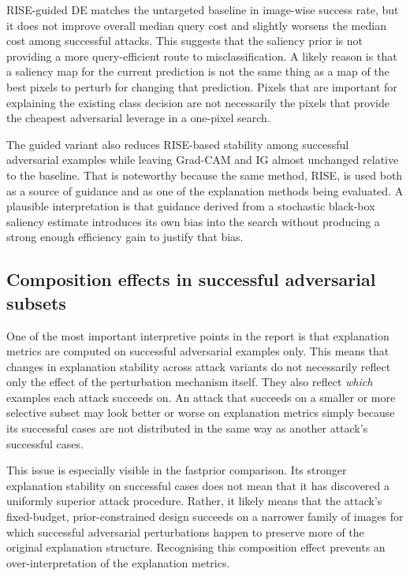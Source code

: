RISE-guided DE matches the untargeted baseline in image-wise success rate, but it does not improve overall median query cost and slightly worsens the median cost among successful attacks.
This suggests that the saliency prior is not providing a more query-efficient route to misclassification.
A likely reason is that a saliency map for the current prediction is not the same thing as a map of the best pixels to perturb for changing that prediction.
Pixels that are important for explaining the existing class decision are not necessarily the pixels that provide the cheapest adversarial leverage in a one-pixel search.

The guided variant also reduces RISE-based stability among successful adversarial examples while leaving Grad-CAM and IG almost unchanged relative to the baseline.
That is noteworthy because the same method, RISE, is used both as a source of guidance and as one of the explanation methods being evaluated.
A plausible interpretation is that guidance derived from a stochastic black-box saliency estimate introduces its own bias into the search without producing a strong enough efficiency gain to justify that bias.

\subsection{Composition effects in successful adversarial subsets}
One of the most important interpretive points in the report is that explanation metrics are computed on successful adversarial examples only.
This means that changes in explanation stability across attack variants do not necessarily reflect only the effect of the perturbation mechanism itself.
They also reflect \emph{which} examples each attack succeeds on.
An attack that succeeds on a smaller or more selective subset may look better or worse on explanation metrics simply because its successful cases are not distributed in the same way as another attack's successful cases.

This issue is especially visible in the fastprior comparison.
Its stronger explanation stability on successful cases does not mean that it has discovered a uniformly superior attack procedure.
Rather, it likely means that the attack's fixed-budget, prior-constrained design succeeds on a narrower family of images for which successful adversarial perturbations happen to preserve more of the original explanation structure.
Recognising this composition effect prevents an over-interpretation of the explanation metrics.

